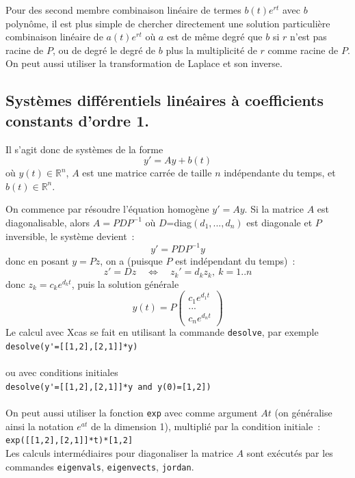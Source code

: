 \documentclass[a4paper,11pt]{book}
\begin{document}
\begin{giacjshere}
Pour des second membre combinaison lin\'eaire
de termes $b(t)e^{rt}$ avec $b$ polyn\^ome,
il est plus simple de chercher directement une solution particuli\`ere
combinaison lin\'eaire de $a(t)e^{rt}$ o\`u $a$ est de m\^eme
degr\'e que $b$ si $r$ n'est pas racine de $P$, ou de degr\'e le
degr\'e de $b$ plus la multiplicit\'e de $r$ comme racine de $P$.
On peut aussi utiliser la transformation de Laplace et son inverse.

\subsection{Syst\`emes diff\'erentiels lin\'eaires \`a coefficients
constants d'ordre 1.}
Il s'agit donc de syst\`emes de la forme
$$ y'=Ay+b(t)$$
o\`u $y(t)\in \mathbb{R}^n$, $A$ est une matrice carr\'ee de taille $n$ 
ind\'ependante du temps, et $b(t) \in \mathbb{R}^n$.

On commence par r\'esoudre l'\'equation homog\`ene $y'=Ay$.
Si la matrice $A$ est diagonalisable, alors $A=PDP^{-1}$ o\`u
$D$=diag$(d_1,...,d_n)$ est diagonale et $P$ inversible, le syst\`eme devient~:
$$ y'=PDP^{-1} y$$
donc en posant $y=Pz$, on a (puisque $P$ est ind\'ependant du temps)~:
$$ z'=Dz \quad \Leftrightarrow \quad z_k'=d_kz_k, \ k=1..n$$
donc $z_k=c_k e^{d_kt}$, puis la solution g\'en\'erale
$$y(t)=P\left( \begin{array}{c} c_1 e^{d_1t} \\ ... \\c_n e^{d_nt}
\end{array} \right)$$
Le calcul avec Xcas se fait en utilisant la commande \verb|desolve|,
par exemple\\
\verb|desolve(y'=[[1,2],[2,1]]*y)|\\
\\
ou avec conditions initiales\\
\verb|desolve(y'=[[1,2],[2,1]]*y and y(0)=[1,2])|\\
\\
On peut aussi utiliser la fonction \verb|exp|
avec comme argument $At$ (on g\'en\'eralise ainsi 
la notation $e^{at}$ 
de la dimension 1), multipli\'e par la condition initiale~:\\
\verb|exp([[1,2],[2,1]]*t)*[1,2]|\\
Les calculs interm\'ediaires pour diagonaliser la matrice $A$ sont
ex\'ecut\'es par les commandes \verb|eigenvals|, \verb|eigenvects|,
\verb|jordan|.


\end{giacjshere}
\end{document}
